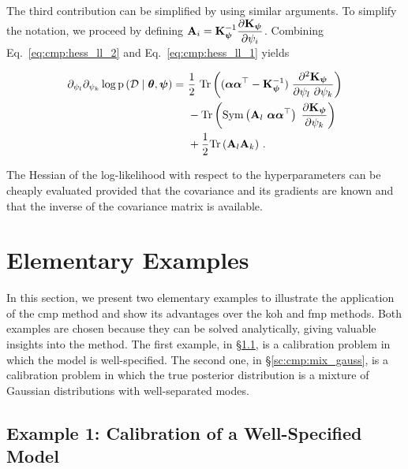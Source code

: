The third contribution can be simplified by using similar arguments.
To simplify the notation, we proceed by defining $\mathbf{A}_i = \mathbf{K}_{\boldsymbol{\psi}}^{-1} \dfrac{\partial \mathbf{K}_{\boldsymbol{\psi}}}{\partial \psi_i}$. Combining Eq.~\eqref{eq:cmp:hess_ll_2} and Eq.~\eqref{eq:cmp:hess_ll_1} yields

\begin{equation}
\left.
    \begin{aligned}
        \partial_{\psi_l} \partial_{\psi_k} \log \likelihood{\data \mid \btheta, \bpsi} = \ & \dfrac{1}{2} \ \mathrm{Tr}\left((\balpha \balpha^{\top} - \mathbf{K}^{-1}_{\bpsi}) \; \dfrac{\partial^2 \mathbf{K}_{\bpsi}}{\partial \psi_l \ \partial \psi_k}\right)  \\
        & - \mathrm{Tr}\left( \text{Sym} \left( \mathbf{A}_l \ \balpha \balpha^{\top} \right) \; \dfrac{\partial \mathbf{K}_{\bpsi}}{\partial \psi_k}\right) \\
        & + \dfrac{1}{2} \mathrm{Tr}\left( \mathbf{A}_l  \mathbf{A}_k\right)\,.
    \end{aligned}
\right.
\label{eq:cmp:hess_ll}
\end{equation}

The Hessian of the log-likelihood with respect to the hyperparameters can be cheaply evaluated provided that the covariance and its gradients are known and that the inverse of the covariance matrix is available. 

\section{Elementary Examples}
\label{sc:cmp:el_examples}

In this section, we present two elementary examples to illustrate the application of the \gls{cmp} method and show its advantages over the \gls{koh} and \gls{fmp} methods. Both examples are chosen because they can be solved analytically, giving valuable insights into the method. The first example, in \S\ref{sc:cmp:no_model_err_cal}, is a calibration problem in which the model is well-specified. The second one, in \S\ref{sc:cmp:mix_gauss}, is a calibration problem in which the true posterior distribution is a mixture of Gaussian distributions with well-separated modes.

\subsection{Example 1: Calibration of a Well-Specified Model}
\label{sc:cmp:no_model_err_cal}


